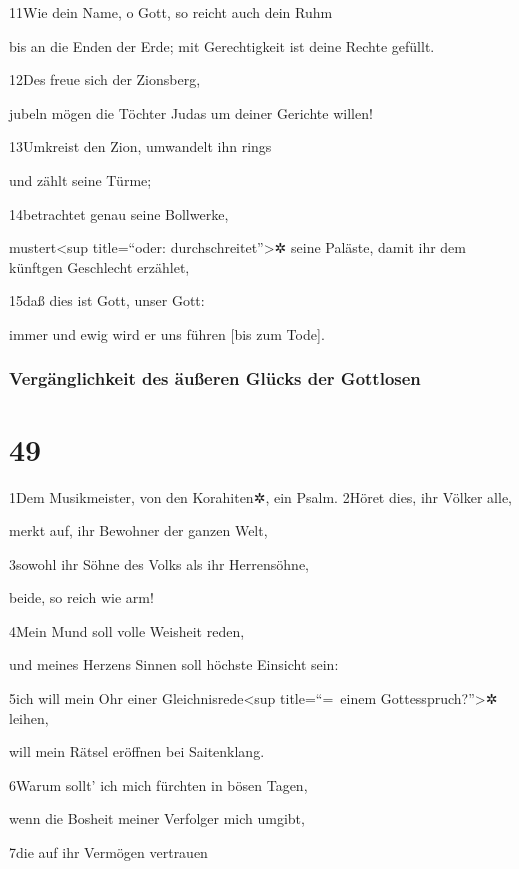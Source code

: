 11Wie dein Name, o Gott, so reicht auch dein Ruhm

bis an die Enden der Erde; mit Gerechtigkeit ist deine Rechte gefüllt.

12Des freue sich der Zionsberg,

jubeln mögen die Töchter Judas um deiner Gerichte willen!

13Umkreist den Zion, umwandelt ihn rings

und zählt seine Türme;

14betrachtet genau seine Bollwerke,

mustert\textless sup title=``oder: durchschreitet''\textgreater✲ seine
Paläste, damit ihr dem künftgen Geschlecht erzählet,

15daß dies ist Gott, unser Gott:

immer und ewig wird er uns führen {[}bis zum Tode{]}.

\hypertarget{verguxe4nglichkeit-des-uxe4uuxdferen-gluxfccks-der-gottlosen}{%
\subsubsection{Vergänglichkeit des äußeren Glücks der
Gottlosen}\label{verguxe4nglichkeit-des-uxe4uuxdferen-gluxfccks-der-gottlosen}}

\hypertarget{section-48}{%
\section{49}\label{section-48}}

1Dem Musikmeister, von den Korahiten✲, ein Psalm. 2Höret dies, ihr
Völker alle,

merkt auf, ihr Bewohner der ganzen Welt,

3sowohl ihr Söhne des Volks als ihr Herrensöhne,

beide, so reich wie arm!

4Mein Mund soll volle Weisheit reden,

und meines Herzens Sinnen soll höchste Einsicht sein:

5ich will mein Ohr einer Gleichnisrede\textless sup title=``=~einem
Gottesspruch?''\textgreater✲ leihen,

will mein Rätsel eröffnen bei Saitenklang.

6Warum sollt' ich mich fürchten in bösen Tagen,

wenn die Bosheit meiner Verfolger mich umgibt,

7die auf ihr Vermögen vertrauen

